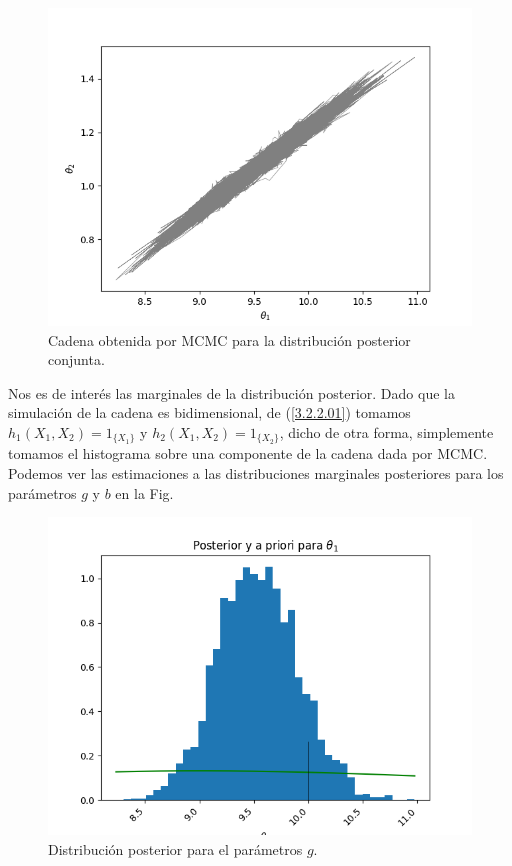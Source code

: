 \begin{figure}[H] 
    \centering 
    \includegraphics[width = 10 cm ]{img/Exp_Central_gravedad/Figuras/Generales/Conjunta_gravedad.png} 
    \caption{Cadena obtenida por MCMC para la distribución posterior conjunta.}
    \label{Fig. 3.2.2.03}
\end{figure} 

Nos es de interés las marginales de la distribución posterior. Dado que la simulación de la cadena es bidimensional, de (\ref{3.2.2.01}) tomamos $h_1(X_1,X_2) = 1_{\{X_1\}}$ y $h_2(X_1,X_2)= 1_{\{X_2\}}$, dicho de otra forma, simplemente tomamos el histograma sobre una componente de la cadena dada por MCMC. Podemos ver las estimaciones a las distribuciones marginales posteriores para los parámetros $g$ y $b$ en la Fig.


\begin{figure}[H] 
    \centering 
    \includegraphics[width = 10 cm ]{img/Exp_Central_gravedad/Figuras/Generales/Post_theta1_gravedad.png} 
    \caption{Distribución posterior para el parámetros $g$.}
    \label{Fig. 3.2.2.04}
\end{figure} 

